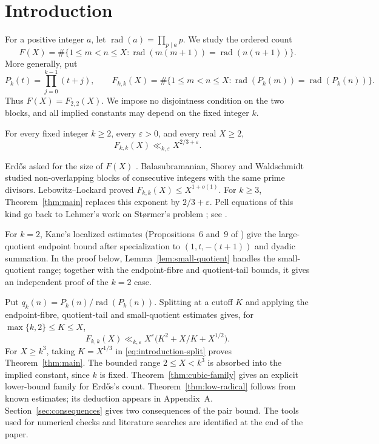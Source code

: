 \section{Introduction}\label{sec:introduction}

For a positive integer $a$, let $\operatorname{rad}(a)=\prod_{p\mid a}p$.
We study the ordered count
\[
 F(X)=\#\{1\le m<n\le X:
 \operatorname{rad}(m(m+1))=\operatorname{rad}(n(n+1))\}.
\]
More generally, put
\[
 P_k(t)=\prod_{j=0}^{k-1}(t+j),\qquad
 F_{k,k}(X)=\#\{1\le m<n\le X:
 \operatorname{rad}(P_k(m))=\operatorname{rad}(P_k(n))\}.
\]
Thus $F(X)=F_{2,2}(X)$. We impose no disjointness condition on the two
blocks, and all implied constants may depend on the fixed integer $k$.

\begin{theorem}\label{thm:main}
For every fixed integer $k\ge2$, every $\varepsilon>0$, and every real
$X\ge2$,
\[
 F_{k,k}(X)\ll_{k,\varepsilon}X^{2/3+\varepsilon}.
\]
\end{theorem}

Erd\H{o}s asked for the size of $F(X)$ \cite{Erdos1980}.
Balasubramanian, Shorey and Waldschmidt \cite[\S5]{BSW1989} studied
non-overlapping blocks of consecutive integers with the same prime divisors.
Lebowitz--Lockard \cite[Theorems~5 and~10]{LL2025} proved
$F_{k,k}(X)\le X^{1+o(1)}$. For $k\ge3$, Theorem~\ref{thm:main}
replaces this exponent by $2/3+\varepsilon$. Pell equations of this kind
go back to Lehmer's work on St{\o}rmer's problem \cite{Lehmer1964}; see
\cite[\S2]{BSW1989}.

For $k=2$, Kane's localized estimates \cite[Propositions~7 and~10]{Kane2014}
(Propositions~6 and~9 of \cite{Kane2011}) give the large-quotient endpoint
bound after specialization to $(1,t,-(t+1))$ and dyadic summation. In the
proof below, Lemma~\ref{lem:small-quotient} handles the small-quotient range;
together with the endpoint-fibre and quotient-tail bounds, it gives an
independent proof of the $k=2$ case.

Put $q_k(n)=P_k(n)/\operatorname{rad}(P_k(n))$. Splitting at a cutoff $K$
and applying the endpoint-fibre, quotient-tail and small-quotient estimates
gives, for $\max\{k,2\}\le K\le X$,
\begin{equation}\label{eq:introduction-split}
F_{k,k}(X)\ll_{k,\varepsilon}
X^\varepsilon\bigl(K^2+X/K+X^{1/2}\bigr).
\end{equation}
For $X\ge k^3$, taking $K=X^{1/3}$ in
\eqref{eq:introduction-split} proves Theorem~\ref{thm:main}. The bounded
range $2\le X<k^3$ is absorbed into the implied constant, since $k$ is fixed.
Theorem~\ref{thm:cubic-family} gives an explicit lower-bound family for
Erd\H{o}s's count. Theorem~\ref{thm:low-radical} follows from known estimates;
its deduction appears in Appendix~A.
Section~\ref{sec:consequences} gives two consequences of the pair bound.
The tools used for numerical checks and literature searches are identified
at the end of the paper.
